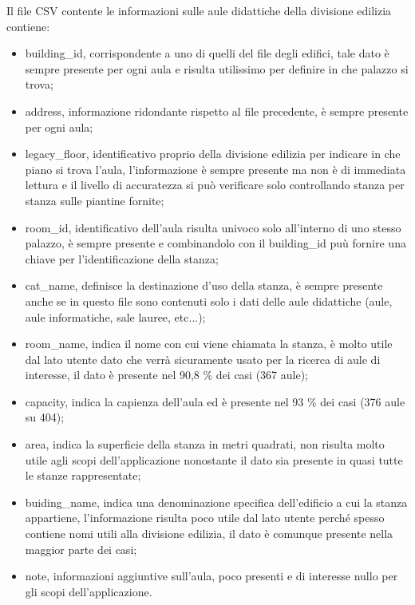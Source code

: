 \documentclass[12pt]{report}
\begin{document}
\vspace{5mm} %

Il file CSV contente le informazioni sulle aule didattiche della divisione edilizia contiene:
\begin{itemize}
\item building\_id, corrispondente a uno di quelli del file degli edifici, tale dato è sempre presente per ogni aula e risulta utilissimo per definire in che palazzo si trova;
\item address, informazione ridondante rispetto al file precedente, è sempre presente per ogni aula;
\item legacy\_floor, identificativo proprio della divisione edilizia per indicare in che piano si trova l'aula, l'informazione è sempre presente ma non è di immediata lettura e il livello di accuratezza si può verificare solo controllando stanza per stanza sulle piantine fornite;
\item room\_id, identificativo dell'aula risulta univoco solo all'interno di uno stesso palazzo, è sempre presente e combinandolo con il building\_id puù fornire una chiave per l'identificazione della stanza;
\item cat\_name, definisce la destinazione d'uso della stanza, è sempre presente anche se in questo file sono contenuti solo i dati delle aule didattiche (aule, aule informatiche, sale lauree, etc...);
\item room\_name, indica il nome con cui viene chiamata la stanza, è molto utile dal lato utente dato che verrà sicuramente usato per la ricerca di aule di interesse, il dato è presente nel 90,8 \% dei casi (367 aule);
\item capacity, indica la capienza dell'aula ed è presente nel 93 \% dei casi (376 aule su 404);
\item area, indica la superficie della stanza in metri quadrati, non risulta molto utile agli scopi dell'applicazione nonostante il dato sia presente in quasi tutte le stanze rappresentate;
\item buiding\_name, indica una denominazione specifica dell'edificio a cui la stanza appartiene, l'informazione risulta poco utile dal lato utente perché spesso contiene nomi utili alla divisione edilizia, il dato è comunque presente nella maggior parte dei casi;
\item note, informazioni aggiuntive sull'aula, poco presenti e di interesse nullo per gli scopi dell'applicazione.    
\end{itemize}
\end{document}

